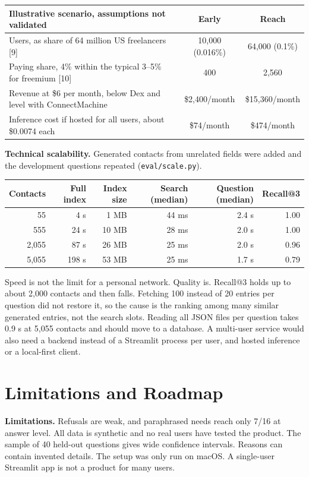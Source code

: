 \documentclass[11pt,letterpaper]{article}
\begin{document}
\begin{center}\small
\begin{tabularx}{\linewidth}{@{}Ycc@{}}
  \toprule
  Illustrative scenario, assumptions not validated & Early & Reach \\
  \midrule
  Users, as share of 64 million US freelancers [9] & 10,000 (0.016\%) & 64,000 (0.1\%) \\
  Paying share, 4\% within the typical 3--5\% for freemium [10] & 400 & 2,560 \\
  Revenue at \$6 per month, below Dex and level with ConnectMachine & \$2,400/month & \$15,360/month \\
  Inference cost if hosted for all users, about \$0.0074 each & \$74/month & \$474/month \\
  \bottomrule
\end{tabularx}
\end{center}

\textbf{Technical scalability.} Generated contacts from unrelated fields were added and the development questions repeated (\texttt{eval/scale.py}).

\begin{center}\small
\begin{tabular}{@{}rrrrrr@{}}
  \toprule
  Contacts & Full index & Index size & Search (median) & Question (median) & Recall@3 \\
  \midrule
  55 & 4 s & 1 MB & 44 ms & 2.4 s & 1.00 \\
  555 & 24 s & 10 MB & 28 ms & 2.0 s & 1.00 \\
  2,055 & 87 s & 26 MB & 25 ms & 2.0 s & 0.96 \\
  5,055 & 198 s & 53 MB & 25 ms & 1.7 s & 0.79 \\
  \bottomrule
\end{tabular}
\end{center}

Speed is not the limit for a personal network. Quality is. Recall@3 holds up to about 2,000 contacts and then falls. Fetching 100 instead of 20 entries per question did not restore it, so the cause is the ranking among many similar generated entries, not the search slots. Reading all JSON files per question takes 0.9 s at 5,055 contacts and should move to a database. A multi-user service would also need a backend instead of a Streamlit process per user, and hosted inference or a local-first client.

\section{Limitations and Roadmap}
\textbf{Limitations.} Refusals are weak, and paraphrased needs reach only 7/16 at answer level. All data is synthetic and no real users have tested the product. The sample of 40 held-out questions gives wide confidence intervals. Reasons can contain invented details. The setup was only run on macOS. A single-user Streamlit app is not a product for many users.
\end{document}

